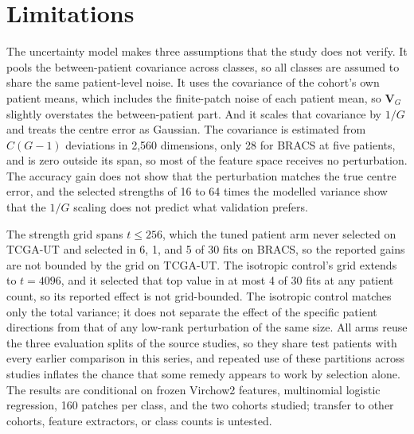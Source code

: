 \section{Limitations}
\label{sec:limitations}
The uncertainty model makes three assumptions that the study does not verify. It pools the between-patient covariance across classes, so all classes are assumed to share the same patient-level noise. It uses the covariance of the cohort's own patient means, which includes the finite-patch noise of each patient mean, so $\mathbf V_G$ slightly overstates the between-patient part. And it scales that covariance by $1/G$ and treats the centre error as Gaussian. The covariance is estimated from $C(G-1)$ deviations in 2,560 dimensions, only 28 for BRACS at five patients, and is zero outside its span, so most of the feature space receives no perturbation. The accuracy gain does not show that the perturbation matches the true centre error, and the selected strengths of 16 to 64 times the modelled variance show that the $1/G$ scaling does not predict what validation prefers.

The strength grid spans $t\leq256$, which the tuned patient arm never selected on TCGA-UT and selected in 6, 1, and 5 of 30 fits on BRACS, so the reported gains are not bounded by the grid on TCGA-UT. The isotropic control's grid extends to $t=4096$, and it selected that top value in at most 4 of 30 fits at any patient count, so its reported effect is not grid-bounded. The isotropic control matches only the total variance; it does not separate the effect of the specific patient directions from that of any low-rank perturbation of the same size. All arms reuse the three evaluation splits of the source studies, so they share test patients with every earlier comparison in this series, and repeated use of these partitions across studies inflates the chance that some remedy appears to work by selection alone. The results are conditional on frozen Virchow2 features, multinomial logistic regression, 160 patches per class, and the two cohorts studied; transfer to other cohorts, feature extractors, or class counts is untested.
